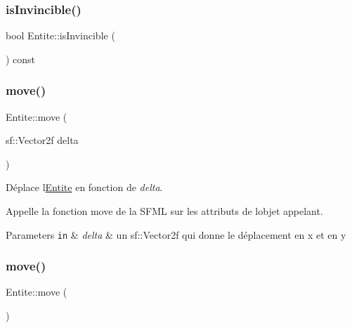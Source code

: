 \subsubsection{\texorpdfstring{is\+Invincible()}{isInvincible()}}
{\footnotesize\ttfamily bool Entite\+::is\+Invincible (\begin{DoxyParamCaption}{ }\end{DoxyParamCaption}) const\hspace{0.3cm}{\ttfamily [inline]}}

\mbox{\label{class_entite_a0e682335d5ae1518970a30eb07d8e6d1}} 
\subsubsection{\texorpdfstring{move()}{move()}\hspace{0.1cm}{\footnotesize\ttfamily [1/2]}}
{\footnotesize\ttfamily Entite\+::move (\begin{DoxyParamCaption}\item[{sf\+::\+Vector2f}]{delta }\end{DoxyParamCaption})}



Déplace l\textquotesingle{}\mbox{\hyperlink{class_entite}{Entite}} en fonction de {\itshape delta}. 

Appelle la fonction move de la S\+F\+ML sur les attributs de l\textquotesingle{}objet appelant. 
\begin{DoxyParams}[1]{Parameters}
\mbox{\tt in}  & {\em delta} & un {\ttfamily sf\+::\+Vector2f} qui donne le déplacement en x et en y \\
\hline
\end{DoxyParams}
\mbox{\label{class_entite_a2403ba6bc4c194e7421b6edd3228b69a}} 
\subsubsection{\texorpdfstring{move()}{move()}\hspace{0.1cm}{\footnotesize\ttfamily [2/2]}}
{\footnotesize\ttfamily Entite\+::move (\begin{DoxyParamCaption}{ }\end{DoxyParamCaption})}



